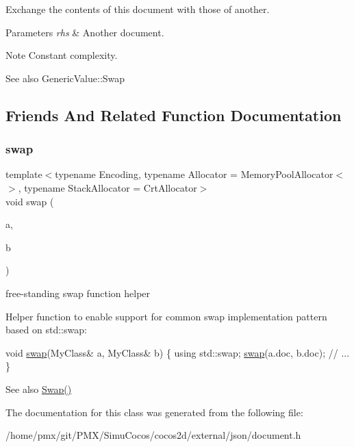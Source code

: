 Exchange the contents of this document with those of another. 


\begin{DoxyParams}{Parameters}
{\em rhs} & Another document. \\
\hline
\end{DoxyParams}
\begin{DoxyNote}{Note}
Constant complexity. 
\end{DoxyNote}
\begin{DoxySeeAlso}{See also}
Generic\+Value\+::\+Swap 
\end{DoxySeeAlso}


\subsection{Friends And Related Function Documentation}
\mbox{\label{classGenericDocument_a0d63efcc43758ac3aed77e868233369d}} 
\subsubsection{\texorpdfstring{swap}{swap}}
{\footnotesize\ttfamily template$<$typename Encoding, typename Allocator = Memory\+Pool\+Allocator$<$$>$, typename Stack\+Allocator = Crt\+Allocator$>$ \\
void swap (\begin{DoxyParamCaption}\item[{\hyperlink{classGenericDocument}{Generic\+Document}$<$ Encoding, Allocator, Stack\+Allocator $>$ \&}]{a,  }\item[{\hyperlink{classGenericDocument}{Generic\+Document}$<$ Encoding, Allocator, Stack\+Allocator $>$ \&}]{b }\end{DoxyParamCaption})\hspace{0.3cm}{\ttfamily [friend]}}



free-\/standing swap function helper 

Helper function to enable support for common swap implementation pattern based on {\ttfamily std\+::swap\+:} 
\begin{DoxyCode}
\textcolor{keywordtype}{void} \hyperlink{classGenericDocument_a0d63efcc43758ac3aed77e868233369d}{swap}(MyClass& a, MyClass& b) \{
    \textcolor{keyword}{using} std::swap;
    \hyperlink{classGenericDocument_a0d63efcc43758ac3aed77e868233369d}{swap}(a.doc, b.doc);
    \textcolor{comment}{// ...}
\}
\end{DoxyCode}
 \begin{DoxySeeAlso}{See also}
\hyperlink{classGenericDocument_a6290e1290fad74177625af5938c0c58f}{Swap()} 
\end{DoxySeeAlso}


The documentation for this class was generated from the following file\+:\begin{DoxyCompactItemize}
\item 
/home/pmx/git/\+P\+M\+X/\+Simu\+Cocos/cocos2d/external/json/document.\+h\end{DoxyCompactItemize}
